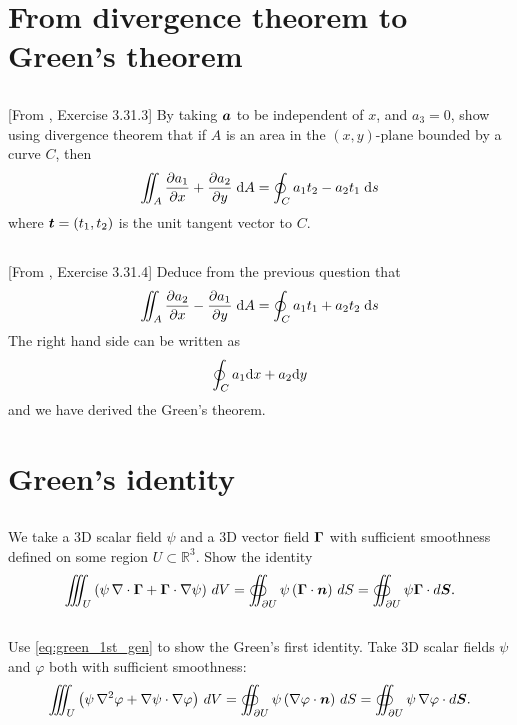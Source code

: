 \documentclass[11pt,letterpaper]{report}
\begin{document}
\section{From divergence theorem to Green's theorem}
\subsection{}
[From \cite{Aris_62}, Exercise 3.31.3] By taking $\boldsymbol{a}$ to be independent of $x$, and $a_3 = 0$, show using divergence theorem that if $A$ is an area in the $(x,y)$-plane bounded by a curve $C$, then
\begin{align}
    \iint_A \frac{\partial a_1}{\partial x}+\frac{\partial a_2}{\partial y}\;\mathrm{d} A = \oint_C a_1t_2-a_2t_1\;\mathrm{d} s
\end{align}
where $\boldsymbol{t}=(t_1,t_2)$ is the unit tangent vector to $C$. 

\subsection{}
[From \cite{Aris_62}, Exercise 3.31.4] Deduce from the previous question that
\begin{align}
    \iint_A \frac{\partial a_2}{\partial x}-\frac{\partial a_1}{\partial y}\;\mathrm{d} A = \oint_C a_1t_1+a_2t_2\;\mathrm{d} s
\end{align}
The right hand side can be written as
\begin{align}
    \oint_C a_1\mathrm{d} x+a_2\mathrm{d} y
\end{align}
and we have derived the Green's theorem.

\section{Green's identity}
\subsection{}
We take a 3D scalar field $\psi$ and a 3D vector field $\boldsymbol{\Gamma}$ with sufficient smoothness defined on some region $U \subset \mathbb{R}^3$. Show the identity
\begin{align}
    \iiint_U \left( \psi \, \nabla \cdot \boldsymbol{\Gamma} + \boldsymbol{\Gamma} \cdot \nabla \psi\right)\, dV  = \oiint_{\partial U} \psi \left( \boldsymbol{\Gamma} \cdot \boldsymbol{n} \right)\, dS=\oiint_{\partial U}\psi\boldsymbol{\Gamma}\cdot d\boldsymbol{S}.\label{eq:green_1st_gen}
\end{align}

\subsection{}
Use \eqref{eq:green_1st_gen} to show the Green's first identity. Take 3D scalar fields $\psi$ and $\varphi$ both with sufficient smoothness:
\begin{align}
    \iiint_U \left( \psi \, \nabla^2 \varphi + \nabla \psi \cdot \nabla \varphi \right)\, dV  = \oiint_{\partial U} \psi \left( \nabla \varphi \cdot \boldsymbol{n} \right)\, dS=\oiint_{\partial U}\psi\,\nabla\varphi\cdot d\boldsymbol{S}.
\end{align}
\end{document}

